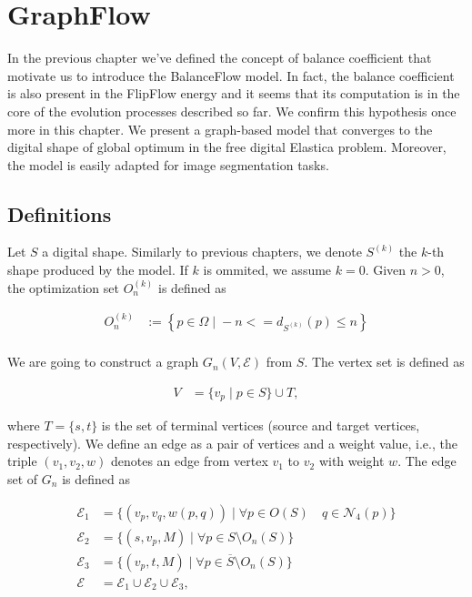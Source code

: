 \chapter{GraphFlow}
\label{chapter:graphflow}

In the previous chapter we've defined the concept of balance coefficient that motivate us to introduce the BalanceFlow model. In fact, the balance coefficient is also present in the FlipFlow energy and it seems that its computation is in the core of the evolution processes described so far. We confirm this hypothesis once more in this chapter. We present a graph-based model that converges to the digital shape of global optimum in the free digital Elastica problem. Moreover, the model is easily adapted for image segmentation tasks.

\section{Definitions}

Let $S$ a digital shape. Similarly to previous chapters, we denote $S^{(k)}$ the $k$-th shape produced by the model. If $k$ is ommited, we assume $k=0$. Given $n>0$, the optimization set $O_n^{(k)}$ is defined as

\begin{align*}
	O_n^{(k)} &:=\left\{ p \in \Omega \; | \; -n <= d_{S^{(k)}}(p) \leq n \right\}\\
\end{align*}

We are going to construct a graph $G_n( V,\mathcal{E})$ from $S$. The vertex set is defined as

\begin{align*}
	V&= \{ v_p \; | \; p \in S \} \cup T,
\end{align*}

where $T=\{s,t\}$ is the set of terminal vertices (source and target vertices, respectively).  We define an edge as a pair of vertices and a weight value, i.e., the triple $(v_1,v_2,w)$ denotes an edge from vertex $v_1$ to $v_2$ with weight $w$. The edge set of $G_n$ is defined as

\begin{align*}
	\mathcal{E}_1 &= \{ (v_p,v_q,w(p,q)) \; | \; \forall p \in O(S) \quad q \in \mathcal{N}_{4}(p) \}\\
	\mathcal{E}_2 &= \{ (s,v_p,M) \; | \; \forall p \in S \setminus O_n(S) \} \\
	\mathcal{E}_3 &= \{ (v_p,t,M) \; | \; \forall p \in \overline{S} \setminus O_n(S) \} \\
	\mathcal{E} &= \mathcal{E}_1 \cup \mathcal{E}_2 \cup \mathcal{E}_3,
\end{align*}

